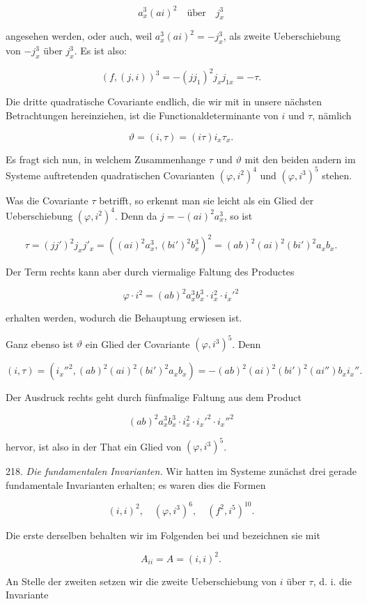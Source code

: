 \[ a_x^3 (ai)^2 \quad \text{über} \quad j_x^3 \]

angesehen werden, oder auch, weil $a_x^3 (ai)^2 = -j_x^3$, als zweite Ueberschiebung
 von $-j_x^3$ über $j_x^3$. Es ist also:

\[ (f, (j, i))^3 = -(j j_1)^2 j_x j_{1x} = -\tau. \]

Die dritte quadratische Covariante endlich, die wir mit in unsere
nächsten Betrachtungen hereinziehen, ist die Functionaldeterminante
von $i$ und $\tau$, nämlich

\[ \vartheta = (i, \tau) = (i \tau) i_x \tau_x. \]

Es fragt sich nun, in welchem Zusammenhange $\tau$ und $\vartheta$ mit den
beiden andern im Systeme auftretenden quadratischen Covarianten
$(\varphi, i^2)^4$ und $(\varphi, i^3)^5$ stehen.

Was die Covariante $\tau$ betrifft, so erkennt man sie leicht als ein
Glied der Ueberschiebung $(\varphi, i^2)^4$. Denn da $j = -(ai)^2 a_x^3$, so ist

\[ \tau = (j j')^2 j_x j'_x = ((ai)^2 a_x^3, (bi')^2 b_x^3)^2 = (ab)^2 (ai)^2 (bi')^2 a_x b_x. \]

Der Term rechts kann aber durch viermalige Faltung des Productes

\[ \varphi \cdot i^2 = (ab)^2 a_x^3 b_x^3 \cdot i_x^2 \cdot i_x'^2 \]

erhalten werden, wodurch die Behauptung erwiesen ist.

Ganz ebenso ist $\vartheta$ ein Glied der Covariante $(\varphi, i^3)^5$. Denn

\[ (i, \tau) = (i_x''^2, (ab)^2 (ai)^2 (bi')^2 a_x b_x) = -(ab)^2 (ai)^2 (bi')^2 (ai'') b_x i_x''. \]

Der Ausdruck rechts geht durch fünfmalige Faltung aus dem Product

\[ (ab)^2 a_x^3 b_x^3 \cdot i_x^2 \cdot i_x'^2 \cdot i_x''^2 \]

hervor, ist also in der That ein Glied von $(\varphi, i^3)^5$.

218. \textit{Die fundamentalen Invarianten.} Wir hatten im Systeme zunächst
 drei gerade fundamentale Invarianten erhalten; es waren dies
die Formen

\[ (i, i)^2, \quad (\varphi, i^3)^6, \quad (f^2, i^5)^{10}. \]

Die erste derselben behalten wir im Folgenden bei und bezeichnen
sie mit

\[ A_{ii} = A = (i, i)^2. \]

An Stelle der zweiten setzen wir die zweite Ueberschiebung von $i$
über $\tau$, d. i. die Invariante

